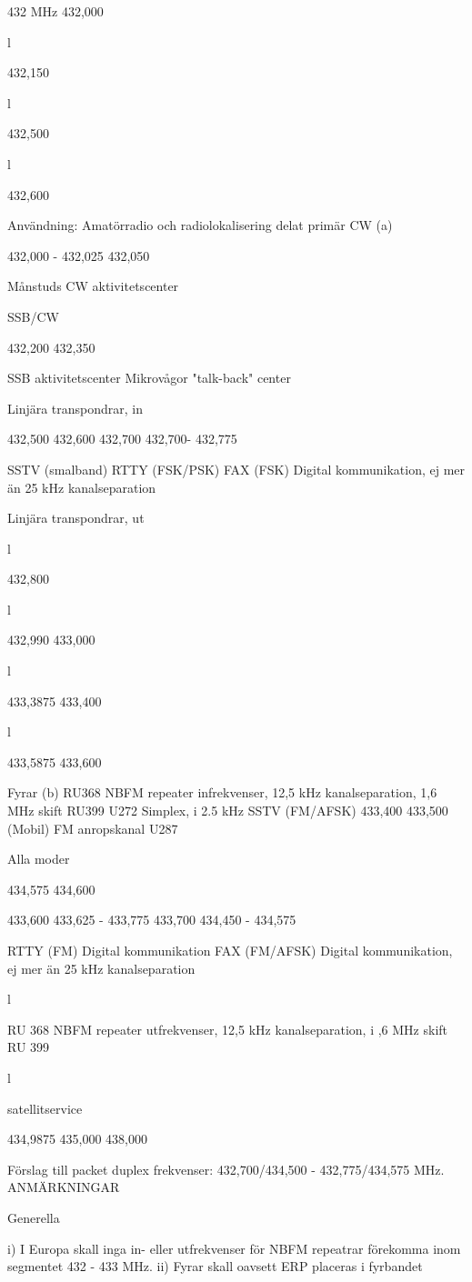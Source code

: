 432 MHz
432,000

l

432,150

l

432,500

l

432,600

Användning: Amatörradio och radiolokalisering delat primär
CW (a)

432,000 - 432,025
432,050

Månstuds
CW aktivitetscenter

SSB/CW

432,200
432,350

SSB aktivitetscenter
Mikrovågor "talk-back" center

Linjära transpondrar, in

432,500
432,600
432,700
432,700- 432,775

SSTV (smalband)
RTTY (FSK/PSK)
FAX (FSK)
Digital kommunikation, ej mer än
25 kHz kanalseparation

Linjära transpondrar, ut

l

432,800

l

432,990
433,000

l

433,3875
433,400

l

433,5875
433,600

Fyrar (b)
RU368
NBFM repeater infrekvenser, 12,5 kHz kanalseparation, 1,6 MHz skift
RU399
U272
Simplex, i 2.5 kHz
SSTV (FM/AFSK)
433,400
433,500
(Mobil) FM anropskanal
U287

Alla moder

434,575
434,600

433,600
433,625 - 433,775
433,700
434,450 - 434,575

RTTY (FM)
Digital kommunikation
FAX (FM/AFSK)
Digital kommunikation, ej mer än
25 kHz kanalseparation

l

RU 368
NBFM repeater utfrekvenser, 12,5 kHz kanalseparation, i ,6 MHz skift
RU 399

l

satellitservice

434,9875
435,000
438,000

Förslag till packet duplex frekvenser: 432,700/434,500 - 432,775/434,575 MHz.
ANMÄRKNINGAR

Generella

i) I Europa skall inga in- eller utfrekvenser för NBFM repeatrar förekomma inom segmentet 432 - 433 MHz.
ii) Fyrar skall oavsett ERP placeras i fyrbandet

